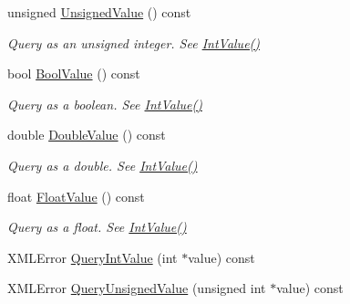 \begin{DoxyCompactItemize}
\item 
unsigned \hyperlink{classtinyxml2_1_1XMLAttribute_a4c7a179907836a136d1ce5acbe53389d}{Unsigned\+Value} () const \hypertarget{classtinyxml2_1_1XMLAttribute_a4c7a179907836a136d1ce5acbe53389d}{}\label{classtinyxml2_1_1XMLAttribute_a4c7a179907836a136d1ce5acbe53389d}

\begin{DoxyCompactList}\small\item\em Query as an unsigned integer. See \hyperlink{classtinyxml2_1_1XMLAttribute_a949d02a5888092cc68c1e29185301863}{Int\+Value()} \end{DoxyCompactList}\item 
bool \hyperlink{classtinyxml2_1_1XMLAttribute_afb444b7a12527f836aa161b54b2f7ce7}{Bool\+Value} () const \hypertarget{classtinyxml2_1_1XMLAttribute_afb444b7a12527f836aa161b54b2f7ce7}{}\label{classtinyxml2_1_1XMLAttribute_afb444b7a12527f836aa161b54b2f7ce7}

\begin{DoxyCompactList}\small\item\em Query as a boolean. See \hyperlink{classtinyxml2_1_1XMLAttribute_a949d02a5888092cc68c1e29185301863}{Int\+Value()} \end{DoxyCompactList}\item 
double \hyperlink{classtinyxml2_1_1XMLAttribute_a336153e5aa1b7ccd6502fc249bfb3fd7}{Double\+Value} () const \hypertarget{classtinyxml2_1_1XMLAttribute_a336153e5aa1b7ccd6502fc249bfb3fd7}{}\label{classtinyxml2_1_1XMLAttribute_a336153e5aa1b7ccd6502fc249bfb3fd7}

\begin{DoxyCompactList}\small\item\em Query as a double. See \hyperlink{classtinyxml2_1_1XMLAttribute_a949d02a5888092cc68c1e29185301863}{Int\+Value()} \end{DoxyCompactList}\item 
float \hyperlink{classtinyxml2_1_1XMLAttribute_ae3d51ff98eacc1dc46efcfdaee5c84ad}{Float\+Value} () const \hypertarget{classtinyxml2_1_1XMLAttribute_ae3d51ff98eacc1dc46efcfdaee5c84ad}{}\label{classtinyxml2_1_1XMLAttribute_ae3d51ff98eacc1dc46efcfdaee5c84ad}

\begin{DoxyCompactList}\small\item\em Query as a float. See \hyperlink{classtinyxml2_1_1XMLAttribute_a949d02a5888092cc68c1e29185301863}{Int\+Value()} \end{DoxyCompactList}\item 
X\+M\+L\+Error \hyperlink{classtinyxml2_1_1XMLAttribute_ad510a83c4ff2755844bb250b125d28ff}{Query\+Int\+Value} (int $\ast$value) const 
\item 
X\+M\+L\+Error \hyperlink{classtinyxml2_1_1XMLAttribute_ac93f5981adfd62ac4ea76bfa668ee2b4}{Query\+Unsigned\+Value} (unsigned int $\ast$value) const \hypertarget{classtinyxml2_1_1XMLAttribute_ac93f5981adfd62ac4ea76bfa668ee2b4}{}\label{classtinyxml2_1_1XMLAttribute_ac93f5981adfd62ac4ea76bfa668ee2b4}


\end{DoxyCompactItemize}
